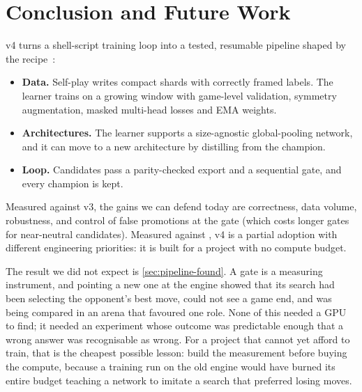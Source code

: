\section{Conclusion and Future Work}\label{sec:conclusion}

\gofer{} v4 turns a shell-script training loop into a tested, resumable pipeline shaped
by the \katago{} recipe~\citep{wu2019accelerating}:
\begin{itemize}
  \item \textbf{Data.} Self-play writes compact shards with correctly framed labels. The
        learner trains on a growing window with game-level validation, symmetry
        augmentation, masked multi-head losses and EMA weights.
  \item \textbf{Architectures.} The learner supports a size-agnostic global-pooling network,
        and it can move to a new architecture by distilling from the champion.
  \item \textbf{Loop.} Candidates pass a parity-checked export and a sequential gate, and
        every champion is kept.
\end{itemize}
Measured against v3, the gains we can defend today are correctness, data volume,
robustness, and control of false promotions at the gate (which costs longer gates for
near-neutral candidates). Measured against \katago{}, v4 is a partial adoption with
different engineering priorities: it is built for a project with no compute budget.

The result we did not expect is \cref{sec:pipeline-found}. A gate is a measuring
instrument, and pointing a new one at the engine showed that its search had been
selecting the opponent's best move, could not see a game end, and was being compared in
an arena that favoured one role. None of this needed a GPU to find; it needed an
experiment whose outcome was predictable enough that a wrong answer was recognisable as
wrong. For a project that cannot yet afford to train, that is the cheapest possible
lesson: build the measurement before buying the compute, because a training run on the
old engine would have burned its entire budget teaching a network to imitate a search
that preferred losing moves.

